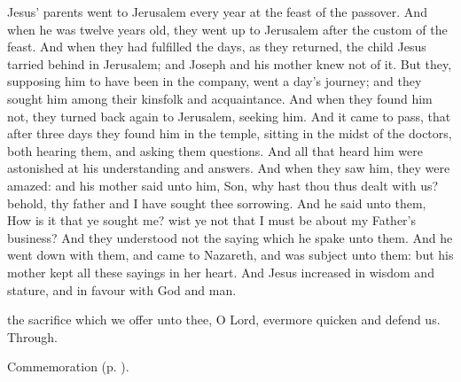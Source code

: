 \vspace{-0.1\baselineskip}

 Jesus' parents went to Jerusalem every year at the feast of the passover. And when he was twelve years old, they went up to Jerusalem after the custom of the feast. And when they had fulfilled the days, as they returned, the child Jesus tarried behind in Jerusalem; and Joseph and his mother knew not of it. But they, supposing him to have been in the company, went a day's journey; and they sought him among their kinsfolk and acquaintance. And when they found him not, they turned back again to Jerusalem, seeking him. And it came to pass, that after three days they found him in the temple, sitting in the midst of the doctors, both hearing them, and asking them questions. And all that heard him were astonished at his understanding and answers. And when they saw him, they were amazed: and his mother said unto him, Son, why hast thou thus dealt with us? behold, thy father and I have sought thee sorrowing. And he said unto them, How is it that ye sought me? wist ye not that I must be about my Father's business? And they understood not the saying which he spake unto them. And he went down with them, and came to Nazareth, and was subject unto them: but his mother kept all these sayings in her heart. And Jesus increased in wisdom and stature, and in favour with God and man.


\vspace{-0.25\baselineskip}

\secret

\vspace{-0.1\baselineskip}

 the sacrifice which we offer unto thee, O Lord, evermore quicken and defend us. Through.


\begin{rubric}
    Commemoration  (p. \pageref{EpiphanyMassSecret}).
\end{rubric}


